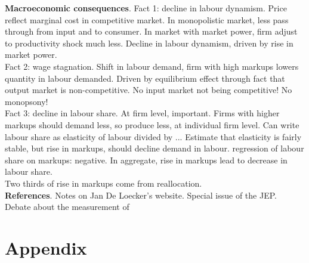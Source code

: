\documentclass{amsart}
\theoremstyle{definition}
\theoremstyle{remark}
\numberwithin{equation}{section}
\begin{document}
\textbf{Macroeconomic consequences}. Fact 1: decline in labour dynamism. Price reflect marginal cost in competitive market. In monopolistic market, less pass through from input and to consumer. In market with market power, firm adjust to productivity shock much less. Decline in labour dynamism, driven by rise in market power.\\

Fact 2: wage stagnation. Shift in labour demand, firm with high markups lowers quantity in labour demanded. Driven by equilibrium effect through fact that output market is non-competitive. No input market not being competitive! No monopsony!\\

Fact 3: decline in labour share. At firm level, important. Firms with higher markups should demand less, so produce less, at individual firm level. Can write labour share as elasticity of labour divided by ... Estimate that elasticity is fairly stable, but rise in markups, should decline demand in labour. regression of labour share on markups: negative. In aggregate, rise in markups lead to decrease in labour share.\\

Two thirds of rise in markups come from reallocation.\\





\textbf{References}. Notes on Jan De Loecker's website. Special issue of the JEP.\\


Debate about the measurement of 

\newpage




\newpage

\section*{Appendix}
\end{document}
